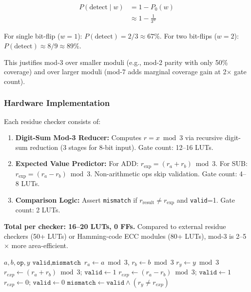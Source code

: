\documentclass[conference]{IEEEtran}
\begin{document}
\begin{equation}
\begin{aligned}
  P(\text{detect} \mid w)
  &= 1 - P_0(w) \\
  &\approx 1 - \frac{1}{3^w}
\end{aligned}
  \label{eq:random_flip_coverage}
\end{equation}

For single bit-flip ($w=1$): $P(\text{detect}) = 2/3 \approx 67\%$.
For two bit-flips ($w=2$): $P(\text{detect}) \approx 8/9 \approx 89\%$.

This justifies mod-3 over smaller moduli (e.g., mod-2 parity with only 50\% coverage) 
and over larger moduli (mod-7 adds marginal coverage gain at 2$\times$ gate count).

\subsubsection{Hardware Implementation}

Each residue checker consists of:

\begin{enumerate}
  \item \textbf{Digit-Sum Mod-3 Reducer:} Computes $r = x \bmod 3$ via recursive digit-sum reduction (3 stages for 8-bit input).
        Gate count: 12--16 LUTs.
  
  \item \textbf{Expected Value Predictor:} For ADD: $r_{\text{exp}} = (r_a + r_b) \bmod 3$. 
        For SUB: $r_{\text{exp}} = (r_a - r_b) \bmod 3$. Non-arithmetic ops skip validation.
        Gate count: 4--8 LUTs.
  
  \item \textbf{Comparison Logic:} Assert \texttt{mismatch} if $r_{\text{result}} \ne r_{\text{exp}}$ and \texttt{valid}=1.
        Gate count: 2 LUTs.
\end{enumerate}

\textbf{Total per checker: 16--20 LUTs, 0 FFs.}
Compared to external residue checkers (50+ LUTs) or Hamming-code ECC modules (80+ LUTs), mod-3 is 2--5$\times$ more area-efficient.

\begin{algorithm}[t]
\caption{Modulo-3 Residue Verification (Per ALU)}
\label{alg:residue_verify}
\footnotesize
\begin{algorithmic}[1]
\Require $a,b,\texttt{op},y$
\Ensure $\texttt{valid},\texttt{mismatch}$
\State $r_a \gets a \bmod 3$, $r_b \gets b \bmod 3$
\State $r_y \gets y \bmod 3$
  \State $r_{exp} \gets (r_a + r_b) \bmod 3$; $\texttt{valid} \gets 1$
  \State $r_{exp} \gets (r_a - r_b) \bmod 3$; $\texttt{valid} \gets 1$
\Else
  \State $r_{exp} \gets 0$; $\texttt{valid} \gets 0$
\EndIf
\State $\texttt{mismatch} \gets \texttt{valid} \land (r_y \neq r_{exp})$
\end{algorithmic}
\end{algorithm}
\end{document}
